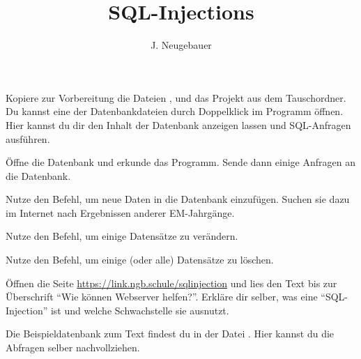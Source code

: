 \documentclass[10pt, a4paper]{scrartcl}
\author{J. Neugebauer}
\title{SQL-Injections}
\date{\Heute}
\begin{document}
\ReiheTitel

Kopiere zur Vorbereitung die Dateien ,  und das Projekt  aus dem Tauschordner. Du kannst eine der Datenbankdateien durch Doppelklick im Programm  öffnen. Hier kannst du dir den Inhalt der Datenbank anzeigen lassen und SQL-Anfragen ausführen.

\begin{aufgabe}[symbol=\symPartner\,\symLaptop]
	\begin{teilaufgaben}
		\teilaufgabe
		Öffne die Datenbank  und erkunde das Programm. Sende dann einige  Anfragen an die Datenbank.
		
		\teilaufgabe
		Nutze den  Befehl, um neue Daten in die Datenbank einzufügen. Suchen sie dazu im Internet nach Ergebnissen anderer EM-Jahrgänge.
		
		\teilaufgabe
		Nutze den  Befehl, um einige Datensätze zu verändern.
		
		\teilaufgabe
		Nutze den  Befehl, um einige (oder alle) Datensätze zu löschen.
	\end{teilaufgaben}
	
	
\end{aufgabe}

\begin{aufgabe}[symbol=\symPartner\,\symLaptop]
	Öffnen die Seite \url{https://link.ngb.schule/sqlinjection} und lies den Text bis zur Überschrift \enquote{Wie können Webserver helfen?}. Erkläre dir selber, was eine \enquote{SQL-Injection} ist und welche Schwachstelle sie ausnutzt.
	
	Die Beispieldatenbank zum Text findest du in der Datei . Hier kannst du die Abfragen selber nachvollziehen.
	
\end{aufgabe}
\end{document}
